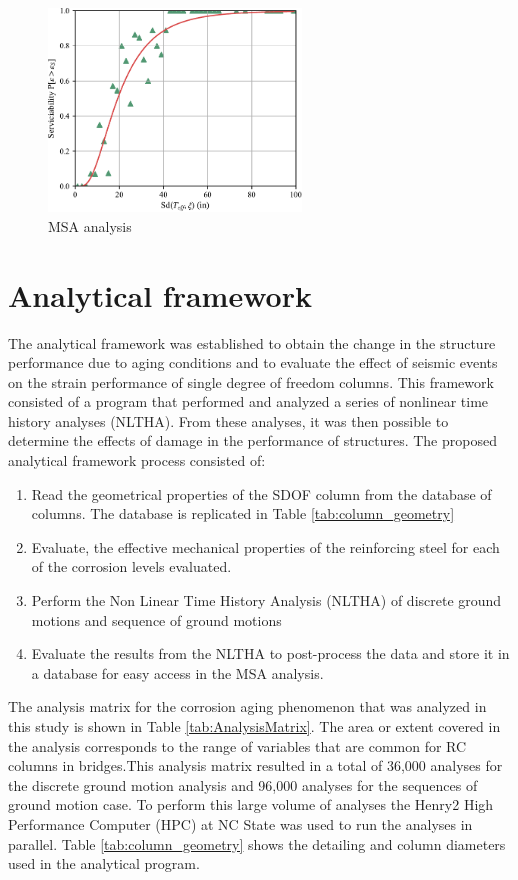 \begin{figure}[htp]
	\centering
	\includegraphics[width=0.60\textwidth]{VAC Thesis 2.0/Chapter-5/figs/MSA_Calc.pdf}
	\caption{MSA analysis}
	\label{fig:msa_sample_01}
\end{figure}
\section{Analytical framework}

The analytical framework was established to obtain the change in the structure performance due to aging conditions and to evaluate the effect of seismic events on the strain performance of single degree of freedom columns. This framework consisted of a program that performed and analyzed a series of nonlinear time history analyses (NLTHA). From these analyses, it was then possible to determine the effects of damage in the performance of structures. The proposed analytical framework process consisted of:

\begin{enumerate}
	\item Read the geometrical properties of the SDOF column from the database of columns. The database is replicated in Table \ref{tab:column_geometry}
	\item Evaluate, the effective mechanical properties of the reinforcing steel for each of the corrosion levels evaluated.
	\item Perform the Non Linear Time History Analysis (NLTHA) of discrete ground motions and sequence of ground motions
	\item Evaluate the results from the NLTHA to post-process the data and store it in a database for easy access in the MSA analysis.
\end{enumerate}

The analysis matrix for the corrosion aging phenomenon that was analyzed in this study is shown in Table \ref{tab:AnalysisMatrix}. The area or extent covered in the analysis corresponds to the range of variables that are common for RC columns in bridges.This analysis matrix resulted in a total of 36,000 analyses for the discrete ground motion analysis and 96,000 analyses for the sequences of ground motion case. To perform this large volume of analyses the Henry2 High Performance Computer (HPC) at NC State was used to run the analyses in parallel. Table \ref{tab:column_geometry} shows the detailing and column diameters used in the analytical program.

